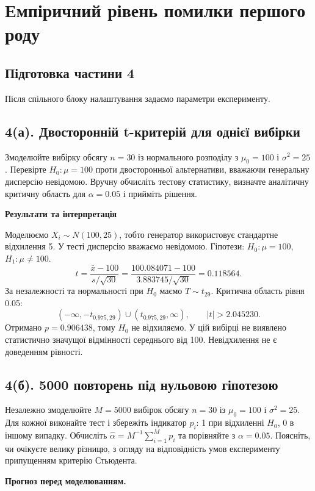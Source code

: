 \documentclass[11pt,a4paper]{article}
\newcommand{\pythoncode}[1]{%
  \Needspace{6\baselineskip}
  \begin{tcolorbox}[enhanced,breakable,colback=black!2!white,colframe=black!15!white,
    colbacktitle=black!6!white,coltitle=accent,fonttitle=\bfseries\small,
    title=Код Python,title after break={Код Python (продовження)},boxrule=0.4pt,arc=1mm,left=2mm,right=2mm,top=2mm,bottom=2mm,
    before skip=6pt,after skip=8pt]
  
  \end{tcolorbox}}
\newcommand{\answerheading}{\Needspace{4\baselineskip}\par\medskip
  {\color{answergreen}\bfseries Результати та інтерпретація}\par\smallskip}
\begin{document}
\clearpage
\section{Емпіричний рівень помилки першого роду}
\subsection*{Підготовка частини 4}
Після спільного блоку налаштування задаємо параметри експерименту.
\pythoncode{part4-cell2}
\subsection*{4(а). Двосторонній t-критерій для однієї вибірки}
\begin{taskstatement}
Змоделюйте вибірку обсягу $n=30$ із нормального розподілу з $\mu_0=100$ і $\sigma^2=25$.
Перевірте $H_0:\mu=100$ проти двосторонньої альтернативи, вважаючи генеральну дисперсію невідомою.
Вручну обчисліть тестову статистику, визначте аналітичну критичну область для $\alpha=0.05$ і прийміть рішення.
\end{taskstatement}


\pythoncode{part4-cell4}
\answerheading
Моделюємо \(X_i\sim N(100,25)\), тобто генератор використовує стандартне відхилення 5. У тесті дисперсію вважаємо невідомою. Гіпотези: \(H_0:\mu=100\), \(H_1:\mu\ne100\). \[t=\frac{\bar x-100}{s/\sqrt{30}}=\frac{100.084071-100}{3.883745/\sqrt{30}}=0.118564.\] За незалежності та нормальності при \(H_0\) маємо \(T\sim t_{29}\). Критична область рівня 0.05: \[(-\infty,-t_{0.975,29})\cup(t_{0.975,29},\infty),\qquad |t|>2.045230.\] Отримано \(p=0.906438\), тому \(H_0\) не відхиляємо. У цій вибірці не виявлено статистично значущої відмінності середнього від 100. Невідхилення не є доведенням рівності.
\subsection*{4(б). 5000 повторень під нульовою гіпотезою}
\begin{taskstatement}
Незалежно змоделюйте $M=5000$ вибірок обсягу $n=30$ із $\mu_0=100$ і $\sigma^2=25$.
Для кожної виконайте тест і збережіть індикатор $p_i$: 1 при відхиленні $H_0$, 0 в іншому випадку.
Обчисліть $\widehat\alpha=M^{-1}\sum_{i=1}^{M}p_i$ та порівняйте з $\alpha=0.05$.
Поясніть, чи очікуєте велику різницю, з огляду на відповідність умов експерименту припущенням критерію Стьюдента.
\end{taskstatement}
\textbf{Прогноз перед моделюванням.}
\end{document}
